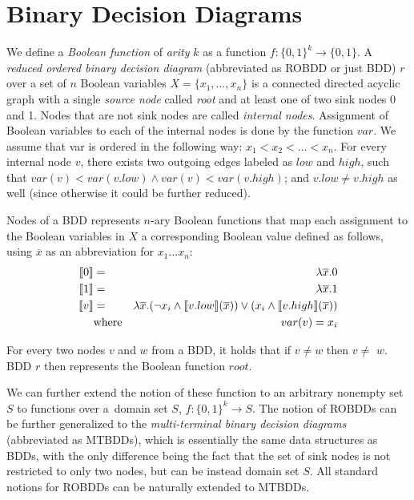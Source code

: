  \section{Binary Decision Diagrams}\label{bdd}

We define a \emph{Boolean function} of \emph{arity} $k$ as a function $f :
\{0,1\}^k \longrightarrow \{0,1\}$. A \emph{reduced ordered binary decision
diagram} (abbreviated as ROBDD or just BDD) $r$ over a set of $n$ Boolean
variables $X = \{x_1,\ldots,x_n\}$ is a connected directed acyclic graph with a
single \emph{source node} called \emph{root} and at least one of two sink nodes
0 and 1. Nodes that are not sink nodes are called \emph{internal nodes}.
Assignment of Boolean variables to each of the internal nodes is done by the
function $var$. We assume that var is ordered in the following way: $x_1 < x_2 <
\ldots < x_n$.
For every internal node $v$, there exists two outgoing edges labeled as $low$
and $high$, such that $var(v) < var(v.low) \wedge var(v) < var(v.high)$; and
$v.low \neq v.high$ as well (since otherwise it could be further reduced).

Nodes of a BDD represents $n$-ary Boolean functions that map each assignment to
the Boolean variables in $X$ a corresponding Boolean value defined as follows,
using $\overline{x}$ as an abbreviation for $x_1\ldots x_n$:
\begin{eqnarray*}
 \text{\textlbrackdbl} 0\text{\textrbrackdbl} & = & \lambda\overline{x}.0\\
 \text{\textlbrackdbl} 1\text{\textrbrackdbl} & = & \lambda\overline{x}.1\\
 \text{\textlbrackdbl} v\text{\textrbrackdbl} & = & \lambda\overline{x}.(\neg
 x_i \wedge \text{\textlbrackdbl} v.low\text{\textrbrackdbl}(\overline{x})) \vee
 (x_i \wedge \text{\textlbrackdbl} v.high\text{\textrbrackdbl}(\overline{x}))\\
       & \text{where} & var(v) = x_i
\end{eqnarray*}

For every two nodes $v$ and $w$ from a BDD, it holds that if $v \neq w$ then
\textlbrackdbl $v$\textrbrackdbl$ \neq$ \textlbrackdbl $w$\textrbrackdbl. BDD
$r$ then represents the Boolean function \textlbrackdbl $root$\textrbrackdbl.

We can further extend the notion of these function to an arbitrary nonempty set
$S$ to functions over a~domain set $S$, $f : \{0,1\}^k \longrightarrow S$. The
notion of ROBDDs can be further generalized to the \emph{multi-terminal binary
decision diagrams} (abbreviated as MTBDDs), which is essentially the same data
structures as BDDs, with the only difference being the fact that the set of sink
nodes is not restricted to only two nodes, but can be instead domain set $S$.
All standard notions for ROBDDs can be naturally extended to MTBDDs.


